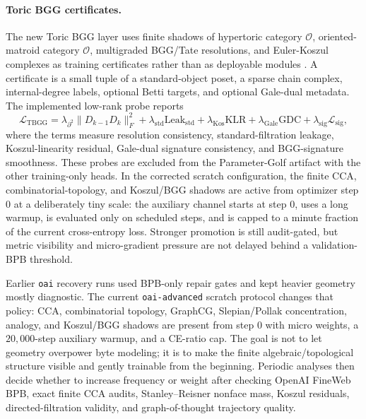 \documentclass[10pt]{article}
\theoremstyle{definition}
\theoremstyle{plain}
\theoremstyle{remark}
\begin{document}
\paragraph{Toric BGG certificates.}
The new Toric BGG layer uses finite shadows of hypertoric category $\mathcal O$, oriented-matroid category $\mathcal O$, multigraded BGG/Tate resolutions, and Euler-Koszul complexes as training certificates rather than as deployable modules \cite{braden2012hypertoric,brownerman2022tate,matusevich2005homological}.  A certificate is a small tuple of a standard-object poset, a sparse chain complex, internal-degree labels, optional Betti targets, and optional Gale-dual metadata.  The implemented low-rank probe reports
\begin{equation}
  \mathcal L_{\mathrm{TBGG}}=
  \lambda_{\partial^2}\|D_{k-1}D_k\|_F^2+
  \lambda_{\mathrm{std}}\mathrm{Leak}_{\mathrm{std}}+
  \lambda_{\mathrm{Kos}}\mathrm{KLR}+
  \lambda_{\mathrm{Gale}}\mathrm{GDC}+
  \lambda_{\mathrm{sig}}\mathcal L_{\mathrm{sig}},
\end{equation}
where the terms measure resolution consistency, standard-filtration leakage, Koszul-linearity residual, Gale-dual signature consistency, and BGG-signature smoothness.  These probes are excluded from the Parameter-Golf artifact with the other training-only heads.  In the corrected scratch configuration, the finite CCA, combinatorial-topology, and Koszul/BGG shadows are active from optimizer step $0$ at a deliberately tiny scale: the auxiliary channel starts at step $0$, uses a long warmup, is evaluated only on scheduled steps, and is capped to a minute fraction of the current cross-entropy loss.  Stronger promotion is still audit-gated, but metric visibility and micro-gradient pressure are not delayed behind a validation-BPB threshold.

Earlier \texttt{oai} recovery runs used BPB-only repair gates and kept heavier geometry mostly diagnostic.  The current \texttt{oai-advanced} scratch protocol changes that policy: CCA, combinatorial topology, GraphCG, Slepian/Pollak concentration, analogy, and Koszul/BGG shadows are present from step $0$ with micro weights, a $20{,}000$-step auxiliary warmup, and a CE-ratio cap.  The goal is not to let geometry overpower byte modeling; it is to make the finite algebraic/topological structure visible and gently trainable from the beginning.  Periodic analyses then decide whether to increase frequency or weight after checking OpenAI FineWeb BPB, exact finite CCA audits, Stanley--Reisner nonface mass, Koszul residuals, directed-filtration validity, and graph-of-thought trajectory quality.
\end{document}
